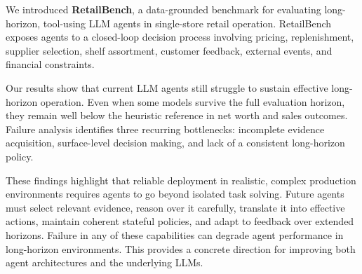 We introduced \textbf{RetailBench}, a data-grounded benchmark for evaluating long-horizon, tool-using LLM agents in single-store retail operation. RetailBench exposes agents to a closed-loop decision process involving pricing, replenishment, supplier selection, shelf assortment, customer feedback, external events, and financial constraints.

Our results show that current LLM agents still struggle to sustain effective long-horizon operation. Even when some models survive the full evaluation horizon, they remain well below the heuristic reference in net worth and sales outcomes. Failure analysis identifies three recurring bottlenecks: incomplete evidence acquisition, surface-level decision making, and lack of a consistent long-horizon policy. 

These findings highlight that reliable deployment in realistic, complex production environments requires agents to go beyond isolated task solving. Future agents must select relevant evidence, reason over it carefully, translate it into effective actions, maintain coherent stateful policies, and adapt to feedback over extended horizons. Failure in any of these capabilities can degrade agent performance in long-horizon environments. This provides a concrete direction for improving both agent architectures and the underlying LLMs.